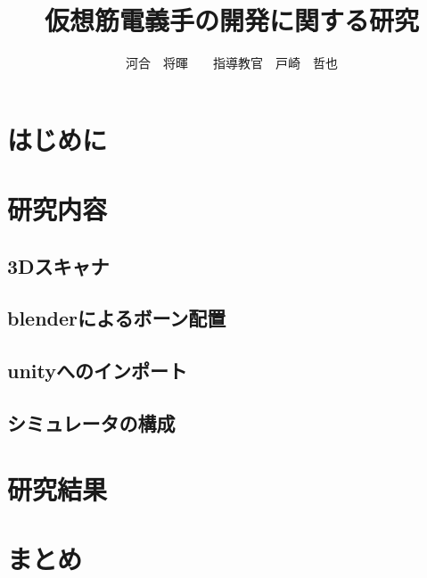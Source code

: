 \documentclass[twocolumn]{jsarticle}
\title{仮想筋電義手の開発に関する研究}
\author{河合　将暉　　指導教官　戸崎　哲也}
\date{}
\begin{document}
\maketitle

\section{はじめに}
	
	\section{研究内容}
		\subsection{3Dスキャナ}
		\subsection{blenderによるボーン配置}
		\subsection{unityへのインポート}
		\subsection{シミュレータの構成}

\section{研究結果}
	
\section{まとめ}


\begin{thebibliography}{99}
\end{thebibliography}
\end{document}
